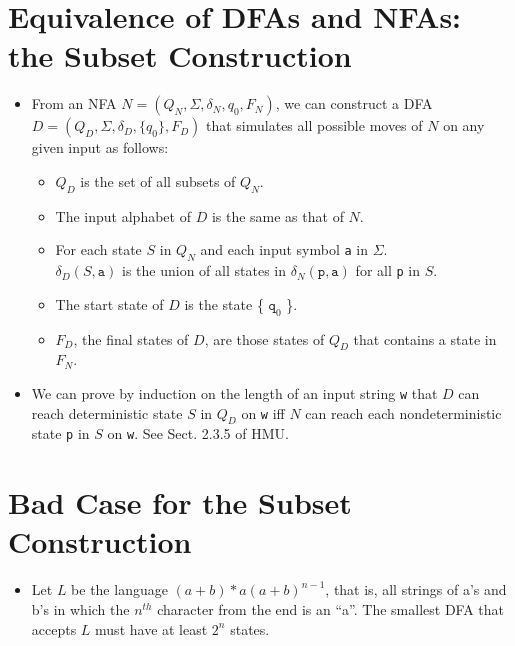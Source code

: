 \documentclass[]{article}
\begin{document}
\section{Equivalence of DFAs and NFAs: the Subset Construction}
  \begin{itemize}
    \item From an NFA $N = (Q_N, \Sigma, \delta_N, q_0, F_N)$, we can construct a 
    DFA $D = (Q_D, \Sigma, \delta_D, \{q_0\}, F_D)$ that simulates all possible 
    moves of $N$ on any given input as follows:
      \begin{itemize}
        \item $Q_D$ is the set of all subsets of $Q_N$.
        \item The input alphabet of $D$ is the same as that of $N$.
        \item For each state $S$ in $Q_N$ and each input symbol \texttt{a} in 
        $\Sigma$. \\
        $\delta_D(S, \texttt{a})$ is the union of all states in $\delta_N(
        \texttt{p}, \texttt{a})$ for all \texttt{p} in $S$. 
        \item The start state of $D$ is the state \{ $\texttt{q}_0$ \}.
        \item $F_D$, the final states of $D$, are those states of $Q_D$ that 
        contains a state in $F_N$.
      \end{itemize}
    \item We can prove by induction on the length of an input string \texttt{w} 
    that $D$ can reach deterministic state $S$ in $Q_D$ on \texttt{w} iff $N$ 
    can reach each nondeterministic state \texttt{p} in $S$ on \texttt{w}. See 
    Sect. 2.3.5 of HMU.
  \end{itemize}
  
\section{Bad Case for the Subset Construction}
  \begin{itemize}
    \item Let $L$ be the language $(a + b)*a(a+b)^{n-1}$, that is, all strings 
    of a's and b's in which the $n^{th}$ character from the end is an ``a''. The 
    smallest DFA that accepts $L$ must have at least $2^n$ states.
  \end{itemize}
  
\end{document}

